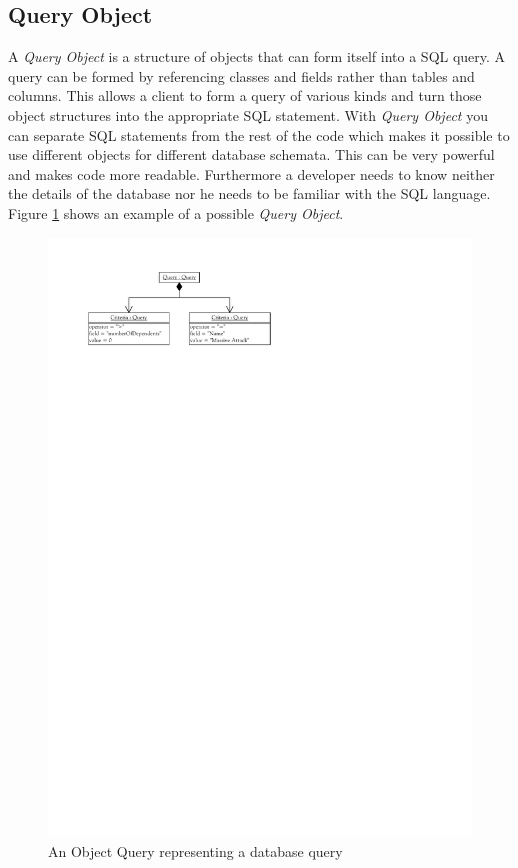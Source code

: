 		\subsection{Query Object}
		\label{subsec:queryObject}
			A \textit{Query Object} is a structure of objects that can form itself into a SQL query.
			A query can be formed by referencing classes and fields rather than tables and columns. 
			This allows a client to form a query of various kinds and turn those object structures into
			the appropriate SQL statement.
			With \textit{Query Object} you can separate SQL statements from the rest of the code
			which makes it possible to use different objects for different database schemata. This
			can be very powerful and makes code more readable. Furthermore a developer needs
			to know neither the details of the database nor he needs to be familiar with the SQL language.
			Figure \ref{fig:patternsQueryObject} shows an example of a possible \textit{Query Object}.
			
			\begin{figure}[htb]
				\begin{center}
					\includegraphics{./files/inc/figures/patternsQueryObject}
					\caption{\label{fig:patternsQueryObject} An Object Query representing a database query}
				\end{center}
			\end{figure}
			
